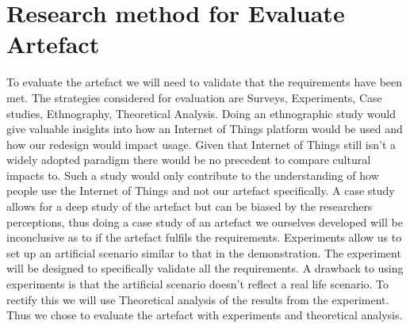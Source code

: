 \section{Research method for Evaluate Artefact}
To evaluate the artefact we will need to validate that the requirements have been met. The strategies considered for evaluation are Surveys, Experiments, Case studies, Ethnography, Theoretical Analysis. 
Doing an ethnographic study would give valuable insights into how an Internet of Things platform would be used and how our redesign would impact usage. Given that Internet of Things still isn't a widely adopted paradigm there would be no precedent to compare cultural impacts to. Such a study would only contribute to the understanding of how people use the Internet of Things and not our artefact specifically.
A case study allows for a deep study of the artefact but can be biased by the researchers perceptions, thus doing a case study of an artefact we ourselves developed will be inconclusive as to if the artefact fulfils the requirements.
Experiments allow us to set up an artificial scenario similar to that in the demonstration. The experiment will be designed to specifically validate all the requirements. A drawback to using experiments is that the artificial scenario doesn't reflect a real life scenario. To rectify this we will use Theoretical analysis of the results from the experiment.
Thus we chose to evaluate the artefact with experiments and theoretical analysis.